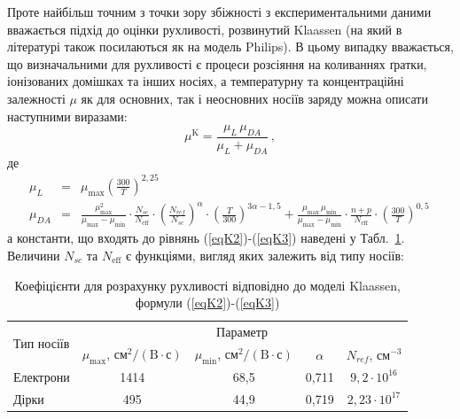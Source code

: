 \documentclass[14pt,a4paper,titlepage,oneside]{book}
\numberwithin{equation}{part}
\begin{document}
Проте найбільш точним з точки зору збіжності з експериментальними даними вважається підхід до оцінки рухливості, розвинутий   Klaassen \cite{KLAASSEN953}
(на який в  літературі також посилаються як на модель Philips).
В цьому випадку вважається, що визначальними для рухливості є процеси розсіяння на коливаннях ґратки, іонізованих домішках та інших носіях, а температурну та
концентраційні залежності $\mu$ як для основних, так і неосновних носіїв заряду можна описати наступними виразами:
\begin{equation}\label{eqK1}
  \mu^\mathrm{K}=\frac{\mu_L\,\mu_{DA}}{\mu_L+\mu_{DA}}\,,
\end{equation}
де
\begin{eqnarray}
  \label{eqK2}
  \mu_L &=&  \mu_\mathrm{max} \left(\frac{300}{T}\right)^{2,25}\, \\ \label{eqK3}
  \mu_{DA}  &=& \frac{\mu_\mathrm{max}^2}{\mu_\mathrm{max} - \mu_\mathrm{min}} \cdot
    \frac{N_{sc}}{N_\mathrm{eff}} \cdot \left(\frac{N_{ref}}{N_{sc}}\right)^{\alpha} \cdot \left(\frac{T}{300}\right)^{3\alpha - 1,5}
    + \frac{\mu_\mathrm{max} \, \mu_\mathrm{min}}{\mu_\mathrm{max} - \mu_\mathrm{min}} \cdot \frac{n + p}{N_\mathrm{eff}} \cdot \left(\frac{300}{T}\right)^{0,5}\,
\end{eqnarray}
а константи, що входять до рівнянь (\ref{eqK2})-(\ref{eqK3}) наведені у Табл.~\ref{tblK1}.
Величини $N_{sc}$ та $N_\mathrm{eff}$ є функціями, вигляд яких залежить від типу носіїв:

\begin{table}
\caption{Коефіцієнти для розрахунку рухливості відповідно до моделі Klaassen, формули (\ref{eqK2})-(\ref{eqK3})}
\label{tblK1}
\centering
\begin{tabular}{|l|c|c|c|c|}
\hline
\multirow{2}{*}{Тип носіїв} & \multicolumn{4}{c|}{Параметр} \\
\cline{2-5}
&$\mu_\mathrm{max}$, $\text{см}^2/(\text{B}\cdot\text{с})$&$\mu_\mathrm{min}$, $\text{см}^2/(\text{B}\cdot\text{с})$&$\alpha$&$N_{ref}$, см$^{-3}$ \rule{0pt}{13pt}\\
\hline
Електрони&1414&68,5&0,711&$9,2\cdot10^{16}$\\
\hline
Дірки&495&44,9&0,719&$2,23\cdot10^{17}$\\
\hline
\end{tabular}
\end{table}
\end{document}
